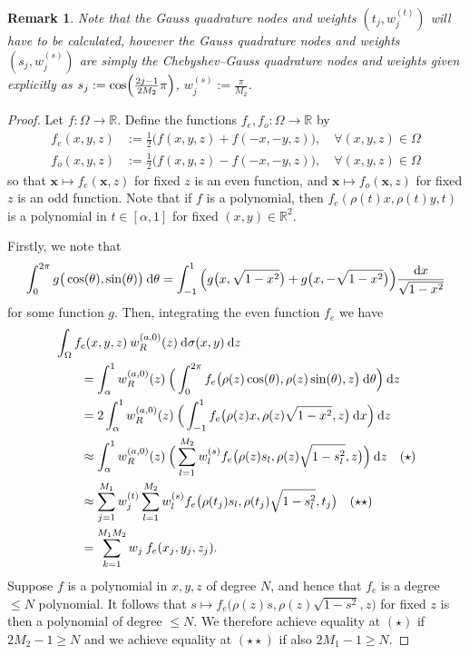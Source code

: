 \documentclass[11pt, oneside]{article}   	%
\newcommand{\half}{\frac{1}{2}}
\newcommand{\R}{\mathbb{R}}
\newcommand{\genjac}{R}
\newcommand{\genjacw}{w_\genjac}
\newcommand{\xvec}{\mathbf{x}}
\newtheorem*{remark}{Remark}
\begin{document}
\begin{remark} 
	Note that the Gauss quadrature nodes and weights $(t_j, w_j^{(t)})$ will have to be calculated, however the Gauss quadrature nodes and weights $(s_j, w_j^{(s)})$ are simply the Chebyshev--Gauss quadrature nodes and weights given explicitly \cite[3.5.23]{DLMF} as $s_j := \cos \fpr(\frac{2j - 1}{2M_2} \pi)$, $w_j^{(s)} := \frac{\pi}{M_2}$.
\end{remark}

\begin{proof}
Let $f : \Omega \to \R$. Define the functions $f_e, f_o : \Omega \to \R$ by 
\begin{align*}
	f_e(x,y,z) &:= \half \Big(f(x, y,z) + f(-x, -y,z)\Big), \quad \forall (x,y,z) \in \Omega\\
	f_o(x,y,z) &:= \half \Big(f(x, y,z) - f(-x, -y,z)\Big), \quad \forall (x,y,z) \in \Omega
\end{align*}
so that $\xvec \mapsto f_e(\xvec, z)$ for fixed $z$ is an even function, and $\xvec \mapsto f_o(\xvec, z)$ for fixed $z$ is an odd function. Note that if $f$ is a polynomial, then $f_e(\rho(t)x, \rho(t)y, t)$ is a polynomial in $t \in [\alpha,1]$ for fixed $(x,y) \in \R^2$. 

Firstly, we note that
\begin{align*}
	\int_0^{2\pi} g\big(\cos(\theta), \sin(\theta)\big) \: {\rm d} \theta = \int_{-1}^1 \Big( g\big(x, \sqrt{1-x^2}\big) + g\big(x, -\sqrt{1-x^2}\big) \Big) \frac{{\rm d} x}{\sqrt{1-x^2}}
\end{align*}
for some function $g$. Then, integrating the even function $f_e$ we have
\begin{align*}
	&\int_\Omega f_e(x,y,z) \: \genjacw^{(a,0)}(z) \: \D \sigma(x,y) \: \D z \\
	&\quad \quad = \int_\alpha^1 \genjacw^{(a,0)}(z) \: \Big( \int_0^{2\pi} f_e\big(\rho(z)\cos(\theta),\rho(z)\sin(\theta), z\big) \: \D \theta \Big) \: \D z \\
	&\quad \quad = 2 \int_\alpha^1 \genjacw^{(a,0)}(z) \: \Big( \int_{-1}^1 f_e\big(\rho(z)x,\rho(z)\sqrt{1-x^2}, z\big) \: \D x \Big) \: \D z \\
	&\quad \quad \approx \int_\alpha^1 \genjacw^{(a,0)}(z) \: \Big( \sum_{l=1}^{M_2} w_l^{(s)} f_e\big(\rho(z) s_l, \rho(z) \sqrt{1 - s_l^2}, z\big) \Big) \: \D z \quad (\star) \\
	&\quad \quad \approx \sum_{j=1}^{M_1} w_j^{(t)} \sum_{l=1}^{M_2} w_l^{(s)} f_e\big(\rho(t_j) s_l, \rho(t_j) \sqrt{1 - s_l^2}, t_j\big) \quad (\star \star) \\
	&\quad \quad = \sum_{k=1}^{M_1 M_2}  w_j \: f_e(x_j, y_j, z_j).
\end{align*}
Suppose $f$ is a polynomial in $x,y,z$ of degree $N$, and hence that $f_e$ is a degree $\le N$ polynomial. It follows that $s \mapsto f_e\big(\rho(z)s,\rho(z)\sqrt{1-s^2}, z\big)$ for fixed $z$ is then a polynomial of degree $\le N$. We therefore achieve equality at $(\star)$ if $2M_2 - 1 \ge N$ and we achieve equality at $(\star \star)$ if also $2M_1 - 1 \ge N$.


\end{proof}
\end{document}

